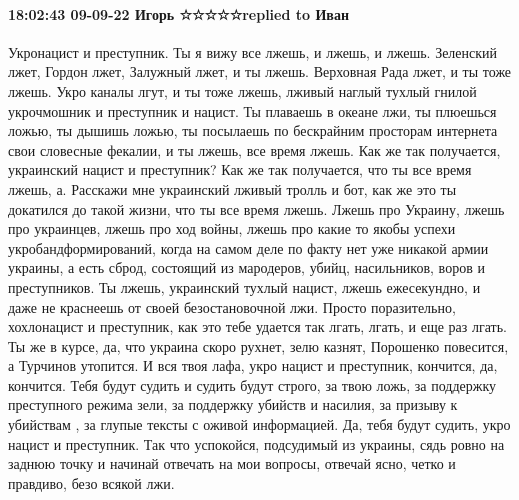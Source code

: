  
 
 
 
 

\paragraph{18:02:43 09-09-22 Игорь ☆☆☆☆☆replied to Иван}

Укронацист и преступник. Ты я вижу все лжешь, и лжешь, и лжешь. Зеленский лжет,
Гордон лжет, Залужный лжет, и ты лжешь. Верховная Рада лжет, и ты тоже лжешь.
Укро каналы лгут, и ты тоже лжешь, лживый наглый тухлый гнилой укрочмошник и
преступник и нацист. Ты плаваешь в океане лжи, ты плюешься ложью, ты дышишь
ложью, ты посылаешь по бескрайним просторам интернета свои словесные фекалии, и
ты лжешь, все время лжешь. Как же так получается, украинский нацист и
преступник? Как же так получается, что ты все время лжешь, а. Расскажи мне
украинский лживый тролль и бот, как же это ты докатился до такой жизни, что ты
все время лжешь. Лжешь про Украину, лжешь про украинцев, лжешь про ход войны,
лжешь про какие то якобы успехи укробандформирований, когда на самом деле по
факту нет уже никакой армии украины, а есть сброд, состоящий из мародеров,
убийц, насильников, воров и преступников. Ты лжешь, украинский тухлый нацист,
лжешь ежесекундно, и даже не краснеешь от своей безостановочной лжи. Просто
поразительно, хохлонацист и преступник, как это тебе удается так лгать, лгать,
и еще раз лгать. Ты же в курсе, да, что украина скоро рухнет, зелю казнят,
Порошенко повесится, а Турчинов утопится. И вся твоя лафа, укро нацист и
преступник, кончится, да, кончится. Тебя будут судить и судить будут строго, за
твою ложь, за поддержку преступного режима зели, за поддержку убийств и
насилия, за призыву к убийствам , за глупые тексты с оживой информацией. Да,
тебя будут судить, укро нацист и преступник. Так что успокойся, подсудимый из
украины, сядь ровно на заднюю точку и начинай отвечать на мои вопросы, отвечай
ясно, четко и правдиво, безо всякой лжи.
